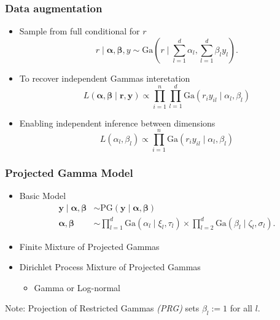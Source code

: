 \documentclass[aspectratio=169]{beamer}
\begin{document}
\begin{frame}
  \frametitle{Data augmentation}
  \begin{itemize}
    \item Sample from full conditional for $r$
      \begin{equation*}
        r\mid\bm{ \alpha},\bm{ \beta}, y \sim \text{Ga}\left(r\mid{\textstyle\sum}_{l = 1}^d \alpha_l,
              {\textstyle\sum}_{l = 1}^d \beta_ly_l\right).
      \end{equation*}
    \pause
    \item To recover independent Gammas interetation
      \begin{equation*}
        L(\bm{\alpha},\bm{\beta} \mid \bm{r},\bm{y}) \propto
            \prod_{i = 1}^n\prod_{l = 1}^{d}\text{Ga}\left(r_iy_{il}\mid\alpha_l,\beta_l\right)
      \end{equation*}
    \pause
    \item Enabling independent inference between dimensions
      \begin{equation*}
        L(\alpha_l,\beta_l) \propto \prod_{i = 1}^n
                  \text{Ga}\left(r_iy_{il}\mid\alpha_l,\beta_l\right)
      \end{equation*}
  \end{itemize}
\end{frame} %

\begin{frame}
  \frametitle{Projected Gamma Model}
  \begin{itemize}
    \item Basic Model
        \begin{equation*}
            \begin{aligned}
                \bm{ y}\mid\bm{\alpha},\bm{\beta} &\sim \text{PG}(\bm{ y}\mid\bm{\alpha},\bm{\beta})\\
                \bm{ \alpha},\bm{\beta} &\sim {\textstyle \prod}_{l = 1}^d \text{Ga}(\alpha_l \mid \xi_l,\tau_l)
                    \times {\textstyle \prod}_{l = 2}^d \text{Ga}(\beta_l\mid \zeta_l,\sigma_l).
            \end{aligned}
        \end{equation*}
    \item Finite Mixture of Projected Gammas
    \item Dirichlet Process Mixture of Projected Gammas
        \begin{itemize}
            \item Gamma or Log-normal
        \end{itemize}
  \end{itemize}
  \vfill
  {\small Note: Projection of Restricted Gammas \emph{(PRG)} sets $\beta_l := 1$ for all $l$.}
\end{frame} %
\end{document}
